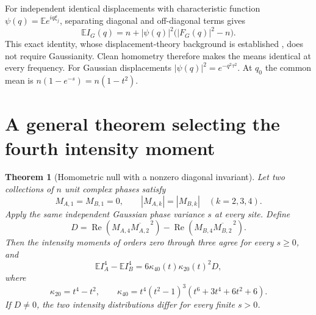 \documentclass[11pt]{article}
\newtheorem{theorem}{Theorem}
\newcommand{\E}{\mathbb E}
\newcommand{\Ree}{\operatorname{Re}}
\begin{document}
For independent identical displacements with characteristic function
$\psi(q)=\E e^{iq\xi_j}$, separating diagonal and off-diagonal terms gives
\begin{equation}\label{eq:common-mean}
 \E I_G(q)=n+|\psi(q)|^2\bigl(|F_G(q)|^2-n\bigr).
\end{equation}
This exact identity, whose displacement-theory background is established
\cite{Gabrielli2004,Klatt2020}, does not require Gaussianity. Clean homometry
therefore makes the means identical at every frequency. For Gaussian
displacements $|\psi(q)|^2=e^{-q^2\tau^2}$. At $q_0$ the common mean is
$n(1-e^{-s})=n(1-t^2)$.

\section{A general theorem selecting the fourth intensity moment}
\label{sec:general-theorem}

\begin{theorem}[Homometric null with a nonzero diagonal invariant]
Let two collections of $n$ unit complex phases satisfy
\[
 M_{A,1}=M_{B,1}=0,\qquad |M_{A,k}|=|M_{B,k}|\quad(k=2,3,4).
\]
Apply the same independent Gaussian phase variance $s$ at every site.
Define
\[
 D=\Ree\!\left(M_{A,4}\overline{M_{A,2}}^{\,2}\right)
   -\Ree\!\left(M_{B,4}\overline{M_{B,2}}^{\,2}\right).
\]
Then the intensity moments of orders zero through three agree for every
$s\ge0$, and
\begin{equation}\label{eq:general-gap}
 \E I_A^4-\E I_B^4=6\kappa_{40}(t)\kappa_{20}(t)^2D,
\end{equation}
where
\[
 \kappa_{20}=t^4-t^2,\qquad
 \kappa_{40}=t^4(t^2-1)^3(t^6+3t^4+6t^2+6).
\]
If $D\ne0$, the two intensity distributions differ for every finite $s>0$.
\end{theorem}
\end{document}
